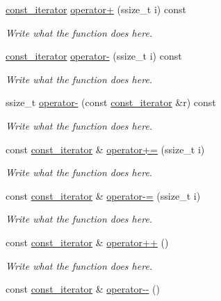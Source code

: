 \begin{DoxyCompactItemize}
\hyperlink{classconst__iterator}{const\+\_\+iterator} \hyperlink{classconst__iterator_a3d92869713daf1dab3b647fa06bde5c0}{operator+} (ssize\+\_\+t i) const 
\begin{DoxyCompactList}\small\item\em Write what the function does here. \end{DoxyCompactList}\item 
\hyperlink{classconst__iterator}{const\+\_\+iterator} \hyperlink{classconst__iterator_afcd820445c5809177a6497a5b2c81a5e}{operator-\/} (ssize\+\_\+t i) const 
\begin{DoxyCompactList}\small\item\em Write what the function does here. \end{DoxyCompactList}\item 
ssize\+\_\+t \hyperlink{classconst__iterator_a370f6da9fa73f00937b3bc2353aef95f}{operator-\/} (const \hyperlink{classconst__iterator}{const\+\_\+iterator} \&r) const 
\begin{DoxyCompactList}\small\item\em Write what the function does here. \end{DoxyCompactList}\item 
const \hyperlink{classconst__iterator}{const\+\_\+iterator} \& \hyperlink{classconst__iterator_adcc1235f5acf32d56ff9a2622579ad5f}{operator+=} (ssize\+\_\+t i)
\begin{DoxyCompactList}\small\item\em Write what the function does here. \end{DoxyCompactList}\item 
const \hyperlink{classconst__iterator}{const\+\_\+iterator} \& \hyperlink{classconst__iterator_a9549258441c9b454157a8ab15d95041c}{operator-\/=} (ssize\+\_\+t i)
\begin{DoxyCompactList}\small\item\em Write what the function does here. \end{DoxyCompactList}\item 
const \hyperlink{classconst__iterator}{const\+\_\+iterator} \& \hyperlink{classconst__iterator_abfa17e91c4ba7ee1aae13434c1848906}{operator++} ()
\begin{DoxyCompactList}\small\item\em Write what the function does here. \end{DoxyCompactList}\item 
const \hyperlink{classconst__iterator}{const\+\_\+iterator} \& \hyperlink{classconst__iterator_aa3278772ee88068045a893d15796f27a}{operator-\/-\/} ()

\end{DoxyCompactItemize}
